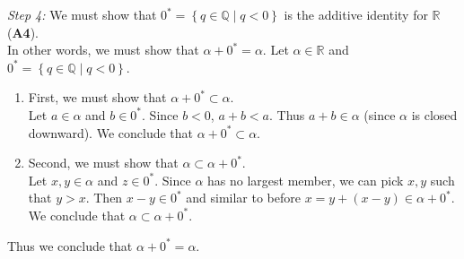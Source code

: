\documentclass[../main.tex]{subfiles}
\begin{document}
\emph{Step 4:} We must show that \( 0^* =\left\{ q \in \mathbb{Q} \mid q < 0 \right\}\) is the additive identity for \( \mathbb{R} \) (\textbf{A4}). \\
In other words, we must show that \( \alpha + 0^* = \alpha \).
Let \( \alpha \in \mathbb{R} \) and \( 0^* = \left\{ q \in \mathbb{Q} \mid q < 0 \right\} \).
\begin{enumerate}
    \item First, we must show that \( \alpha + 0^* \subset \alpha \). \\
    Let \( a \in \alpha \) and \( b \in 0^* \).
    Since \( b < 0 \), \( a + b < a \).
    Thus \( a + b \in \alpha \) (since \( \alpha \) is closed downward).
    We conclude that \( \alpha + 0^* \subset \alpha \).

    \item Second, we must show that \( \alpha \subset \alpha + 0^* \). \\
    Let \( x,y \in \alpha \) and \( z \in 0^* \). Since \( \alpha \) has no largest member, we can pick \( x,y \) such that \( y > x \).
    Then \( x - y \in 0^* \) and similar to before \( x = y + (x - y) \in \alpha + 0^* \).
    We conclude that \( \alpha \subset \alpha + 0^* \).
\end{enumerate}
Thus we conclude that \( \alpha + 0^* = \alpha \).
\end{document}

